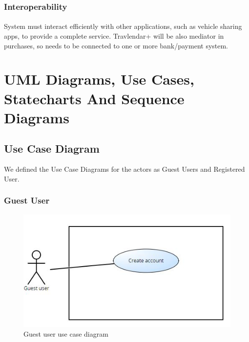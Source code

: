 \documentclass{article}
\begin{document}
\subsubsection{Interoperability}
\paragraph{}
System must interact efficiently with other applications, such as vehicle sharing apps, to provide a complete service. Travlendar+ will be also mediator in purchases, so needs to be connected to one or more bank/payment system.
\section{UML Diagrams, Use Cases, Statecharts And Sequence Diagrams}
\subsection{Use Case Diagram}
We defined the Use Case Diagrams for the actors as Guest Users and Registered User.
\subsubsection{Guest User}
\begin{figure}[H]
\includegraphics[width=\linewidth]{Guestuserusecase.jpg}
\caption{Guest user use case diagram}
\label{fig:UCD1}
\end{figure}
\end{document}
